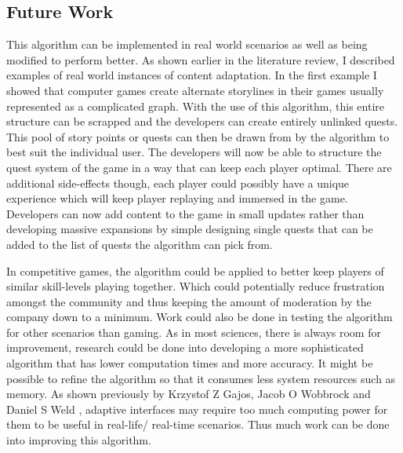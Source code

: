 \documentclass[11pt]{article}
\begin{document}
\subsection{Future Work}
This algorithm can be implemented in real world scenarios as well as being modified to perform better. As shown earlier in the literature review, I described examples of real world instances of content adaptation. In the first example I showed that computer games create alternate storylines in their games usually represented as a complicated graph. With the use of this algorithm, this entire structure can be scrapped and the developers can create entirely unlinked quests. This pool of story points or quests can then be drawn from by the algorithm to best suit the individual user. The developers will now be able to structure the quest system of the game in a way that can keep each player optimal. There are additional side-effects though, each player could possibly have a unique experience which will keep player replaying and immersed in the game. Developers can now add content to the game in small updates rather than developing massive expansions by simple designing single quests that can be added to the list of quests the algorithm can pick from.
\vspace{6.0 mm}

In competitive games, the algorithm could be applied to better keep players of similar skill-levels playing together. Which could potentially reduce frustration amongst the community and thus keeping the amount of moderation by the company down to a minimum. Work could also be done in testing the algorithm for other scenarios than gaming. As in most sciences, there is always room for improvement, research could be done into developing a more sophisticated algorithm that has lower computation times and more accuracy. It might be possible to refine the algorithm so that it consumes less system resources such as memory. As shown previously by Krzystof Z Gajos, Jacob O Wobbrock and Daniel S Weld \citep{gajos2008improving}, adaptive interfaces may require too much computing power for them to be useful in real-life/ real-time scenarios. Thus much work can be done into improving this algorithm. 

\clearpage
\end{document}

